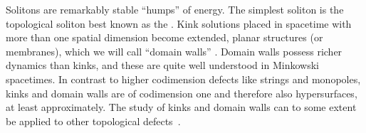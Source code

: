 







 

{Solitons} are remarkably stable ``humps'' of energy. The simplest soliton is the topological soliton best known as the . 
Kink solutions placed in spacetime with more than one spatial dimension become extended, planar structures (or membranes), which we will call ``domain walls'' \cite{vachaspatiKinksDomainWalls2006}. 
Domain walls possess richer dynamics than kinks, and these are quite well understood in Minkowski spacetimes. %
In contrast to higher codimension defects like strings and monopoles, kinks and domain walls are of codimension one and therefore also hypersurfaces, at least approximately. %
The study of kinks and domain walls can to some extent be applied to other topological defects~\citep{vachaspatiKinksDomainWalls2006}.



















